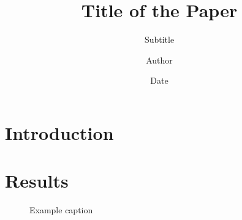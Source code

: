 \documentclass[12pt,letterpaper,]{article}
\title{Title of the Paper}
\subtitle{Subtitle}
\author{Author}
\date{Date}
\begin{document}
\maketitle


\begin{abstract}
\lipsum[1]
\end{abstract}
\thispagestyle{empty}
\clearpage

\setcounter{page}{1}

\renewcommand\refname{}


\section{Introduction}

\lipsum[2-4]

\section{Results}

\lipsum[1]

\begin{figure}[ht]
\centering
\caption{Example caption}
\begin{pgfpicture}
\end{pgfpicture}
\end{figure}

\lipsum[2-4]
\end{document}

